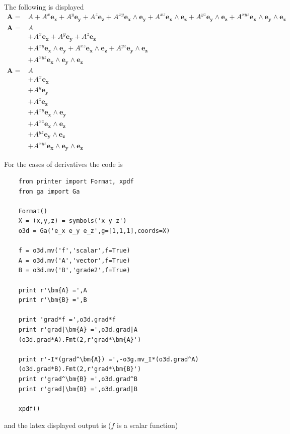 \documentclass[12pt]{report}
\newcommand{\bm}[1]{\boldsymbol{#1}}
\newcommand{\W}{\wedge}
\begin{document}
The following is displayed
\begin{align*}
      \bm{A} = & A+A^{x}\bm{e_{x}}+A^{y}\bm{e_{y}}+A^{z}\bm{e_{z}}+A^{xy}\bm{e_{x}\W e_{y}}+A^{xz}\bm{e_{x}\W e_{z}}+A^{yz}\bm{e_{y}\W e_{z}}+A^{xyz}\bm{e_{x}\W e_{y}\W e_{z}} \\
      \bm{A} =  & A \\  & +A^{x}\bm{e_{x}}+A^{y}\bm{e_{y}}+A^{z}\bm{e_{z}} \\  & +A^{xy}\bm{e_{x}\W e_{y}}+A^{xz}\bm{e_{x}\W e_{z}}+A^{yz}\bm{e_{y}\W e_{z}} \\  & +A^{xyz}\bm{e_{x}\W e_{y}\W e_{z}} \\
      \bm{A} =  & A \\  & +A^{x}\bm{e_{x}} \\  & +A^{y}\bm{e_{y}} \\  & +A^{z}\bm{e_{z}} \\  & +A^{xy}\bm{e_{x}\W e_{y}} \\  & +A^{xz}\bm{e_{x}\W e_{z}} \\  & +A^{yz}\bm{e_{y}\W e_{z}} \\  & +A^{xyz}\bm{e_{x}\W e_{y}\W e_{z}}
\end{align*}

For the cases of derivatives the code is

\begin{lstlisting}
    from printer import Format, xpdf
    from ga import Ga

    Format()
    X = (x,y,z) = symbols('x y z')
    o3d = Ga('e_x e_y e_z',g=[1,1,1],coords=X)

    f = o3d.mv('f','scalar',f=True)
    A = o3d.mv('A','vector',f=True)
    B = o3d.mv('B','grade2',f=True)

    print r'\bm{A} =',A
    print r'\bm{B} =',B

    print 'grad*f =',o3d.grad*f
    print r'grad|\bm{A} =',o3d.grad|A
    (o3d.grad*A).Fmt(2,r'grad*\bm{A}')

    print r'-I*(grad^\bm{A}) =',-o3g.mv_I*(o3d.grad^A)
    (o3d.grad*B).Fmt(2,r'grad*\bm{B}')
    print r'grad^\bm{B} =',o3d.grad^B
    print r'grad|\bm{B} =',o3d.grad|B

    xpdf()
\end{lstlisting}

and the latex displayed output is ($f$ is a scalar function)
\end{document}
